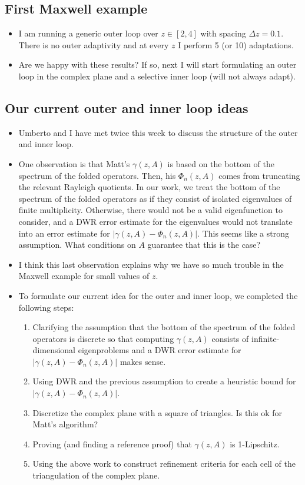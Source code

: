 \documentclass[12pt,a4paper]{article}
\begin{document}
\subsection{First Maxwell example}
\begin{itemize}
    \item I am running a generic outer loop over $z \in [2, 4]$ with spacing $\Delta z = 0.1.$ There is no outer adaptivity and at every $z$ I perform 5 (or 10) adaptations. 
    \item Are we happy with these results? If so, next I will start formulating an outer loop in the complex plane and a selective inner loop (will not always adapt).
\end{itemize}

\subsection{Our current outer and inner loop ideas}

\begin{itemize}
    \item Umberto and I have met twice this week to discuss the structure of the outer and inner loop.
    \item One observation is that Matt's $\gamma(z, A)$ is based on the bottom of the spectrum of the folded operators. Then, his $\Phi_n(z, A)$ comes from truncating the relevant Rayleigh quotients. In our work, we treat the bottom of the spectrum of the folded operators as if they consist of isolated eigenvalues of finite multiplicity. Otherwise, there would not be a valid eigenfunction to consider, and a DWR error estimate for the eigenvalues would not translate into an error estimate for $|\gamma(z, A) - \Phi_n(z, A)|.$ This seems like a strong assumption. What conditions on $A$ guarantee that this is the case? 
    \item I think this last observation explains why we have so much trouble in the Maxwell example for small values of $z.$ 
    \item To formulate our current idea for the outer and inner loop, we completed the following steps:
    \begin{enumerate}
        \item Clarifying the assumption that the bottom of the spectrum of the folded operators is discrete so that computing $\gamma(z,A)$ consists of infinite-dimensional eigenproblems and a DWR error estimate for $|\gamma(z, A) - \Phi_n(z, A)|$ makes sense. 
        \item Using DWR and the previous assumption to create a heuristic bound for $|\gamma(z, A) - \Phi_n(z, A)|.$
        \item Discretize the complex plane with a square of triangles. Is this ok for Matt's algorithm?
        \item Proving (and finding a reference proof) that $\gamma(z, A)$ is 1-Lipschitz.
        \item Using the above work to construct refinement criteria for each cell of the triangulation of the complex plane. 
    \end{enumerate}
\end{itemize}
\end{document}
